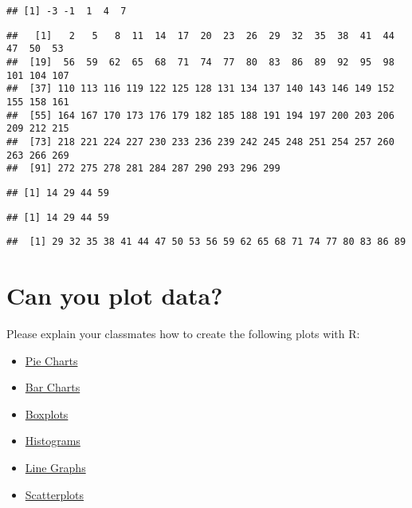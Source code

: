 \documentclass[
]{article}
\providecommand{\tightlist}{%
  \setlength{\itemsep}{0pt}\setlength{\parskip}{0pt}}
\begin{document}
\begin{verbatim}
## [1] -3 -1  1  4  7
\end{verbatim}

\begin{verbatim}
##   [1]   2   5   8  11  14  17  20  23  26  29  32  35  38  41  44  47  50  53
##  [19]  56  59  62  65  68  71  74  77  80  83  86  89  92  95  98 101 104 107
##  [37] 110 113 116 119 122 125 128 131 134 137 140 143 146 149 152 155 158 161
##  [55] 164 167 170 173 176 179 182 185 188 191 194 197 200 203 206 209 212 215
##  [73] 218 221 224 227 230 233 236 239 242 245 248 251 254 257 260 263 266 269
##  [91] 272 275 278 281 284 287 290 293 296 299
\end{verbatim}

\begin{verbatim}
## [1] 14 29 44 59
\end{verbatim}

\begin{verbatim}
## [1] 14 29 44 59
\end{verbatim}

\begin{verbatim}
##  [1] 29 32 35 38 41 44 47 50 53 56 59 62 65 68 71 74 77 80 83 86 89
\end{verbatim}

\hypertarget{can-you-plot-data}{%
\section{Can you plot data?}\label{can-you-plot-data}}

Please explain your classmates how to create the following plots with R:

\begin{itemize}
\tightlist
\item
  \href{https://www.tutorialspoint.com/r/r_pie_charts.htm}{Pie Charts}
\item
  \href{https://www.tutorialspoint.com/r/r_bar_charts.htm}{Bar Charts}
\item
  \href{https://www.tutorialspoint.com/r/r_boxplots.htm}{Boxplots}
\item
  \href{https://www.tutorialspoint.com/r/r_histograms.htm}{Histograms}
\item
  \href{https://www.tutorialspoint.com/r/r_line_graphs.htm}{Line Graphs}
\item
  \href{https://www.tutorialspoint.com/r/r_scatterplots.htm}{Scatterplots}
\end{itemize}
\end{document}
